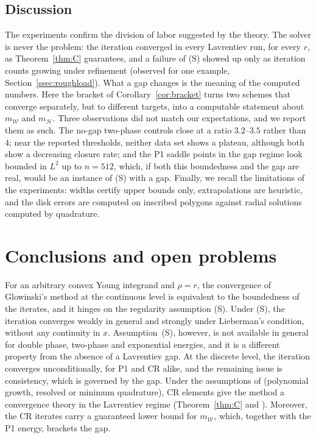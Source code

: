 \documentclass[11pt]{amsart}
\theoremstyle{definition}
\theoremstyle{remark}
\numberwithin{equation}{section}
\newcommand{\mW}{m_{\mathcal W}}
\newcommand{\mH}{m_{\mathcal H}}
\begin{document}
\subsection{Discussion}\label{ssec:discussion}
The experiments confirm the division of labor suggested by the theory. The solver is never the problem: the iteration converged in every Lavrentiev run, for every $r$, as Theorem~\ref{thm:C} guarantees, and a failure of (S) showed up only as iteration counts growing under refinement (observed for one example, Section~\ref{ssec:roughload}). What a gap changes is the meaning of the computed numbers. Here the bracket of Corollary~\ref{cor:bracket} turns two schemes that converge separately, but to different targets, into a computable statement about $\mW$ and $\mH$. Three observations did not match our expectations, and we report them as such. The no-gap two-phase controls close at a ratio $3.2$--$3.5$ rather than $4$; near the reported thresholds, neither data set shows a plateau, although both show a decreasing closure rate; and the P1 saddle points in the gap regime look bounded in $L^2$ up to $n=512$, which, if both this boundedness and the gap are real, would be an instance of (S) with a gap. Finally, we recall the limitations of the experiments: widths certify upper bounds only, extrapolations are heuristic, and the disk errors are computed on inscribed polygons against radial solutions computed by quadrature.

\section{Conclusions and open problems}\label{sec:conclusions}
For an arbitrary convex Young integrand and $\rho=r$, the convergence of Glowinski's method at the continuous level is equivalent to the boundedness of the iterates, and it hinges on the regularity assumption (S). Under (S), the iteration converges weakly in general and strongly under Lieberman's condition, without any continuity in $x$. Assumption~(S), however, is not available in general for double phase, two-phase and exponential energies, and it is a different property from the absence of a Lavrentiev gap. At the discrete level, the iteration converges unconditionally, for P1 and CR alike, and the remaining issue is consistency, which is governed by the gap. Under the assumptions of \cite[Thm.~1]{BalciOrtnerStorn2022} (polynomial growth, resolved or minimum quadrature), CR elements give the method a convergence theory in the Lavrentiev regime (Theorem~\ref{thm:C} and \cite[Thm.~1]{BalciOrtnerStorn2022}). Moreover, the CR iterates carry a guaranteed lower bound for $\mW$, which, together with the P1 energy, brackets the gap.
\end{document}
